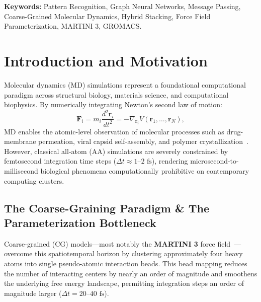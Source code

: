 \documentclass[11pt,a4paper]{article}
\begin{document}
\vspace{0.5em}
\noindent \textbf{Keywords:} Pattern Recognition, Graph Neural Networks, Message Passing, Coarse-Grained Molecular Dynamics, Hybrid Stacking, Force Field Parameterization, MARTINI 3, GROMACS.
\vspace{1em}

\section{Introduction and Motivation}
\label{sec:intro}

Molecular dynamics (MD) simulations represent a foundational computational paradigm across structural biology, materials science, and computational biophysics. By numerically integrating Newton's second law of motion:
\begin{equation}
\mathbf{F}_i = m_i \frac{d^2 \mathbf{r}_i}{dt^2} = -\nabla_{\mathbf{r}_i} V(\mathbf{r}_1, \dots, \mathbf{r}_N),
\label{eq:newton}
\end{equation}
MD enables the atomic-level observation of molecular processes such as drug-membrane permeation, viral capsid self-assembly, and polymer crystallization~\cite{souza2021martini3,tuckerman2010statistical}. However, classical all-atom (AA) simulations are severely constrained by femtosecond integration time steps ($\Delta t \approx 1\text{--}2\text{ fs}$), rendering microsecond-to-millisecond biological phenomena computationally prohibitive on contemporary computing clusters.

\subsection{The Coarse-Graining Paradigm \& The Parameterization Bottleneck}
Coarse-grained (CG) models---most notably the \textbf{MARTINI 3} force field~\cite{souza2021martini3}---overcome this spatiotemporal horizon by clustering approximately four heavy atoms into single pseudo-atomic interaction beads. This bead mapping reduces the number of interacting centers by nearly an order of magnitude and smoothens the underlying free energy landscape, permitting integration steps an order of magnitude larger ($\Delta t = 20\text{--}40\text{ fs}$).
\end{document}
